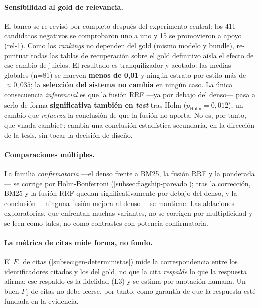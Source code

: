 \paragraph{Sensibilidad al gold de relevancia.} El banco se re-revisó por completo después del experimento central: los 411 candidatos negativos se comprobaron uno a uno y 15 se promovieron a apoyo (rel-1). Como los \emph{rankings} no dependen del gold (mismo modelo y bundle), re-puntuar todas las tablas de recuperación sobre el gold definitivo aísla el efecto de ese cambio de juicios. El resultado es tranquilizador y acotado: las medias globales (n=81) se mueven \textbf{menos de 0,01} y ningún estrato por estilo más de \textbf{${\approx}0{,}035$}; la \textbf{selección del sistema no cambia} en ningún caso. La única consecuencia \emph{inferencial} es que la fusión RRF —ya por debajo del denso— pasa a serlo de forma \textbf{significativa también en \emph{test}} tras Holm ($p_{\text{Holm}}=0{,}012$), un cambio que \emph{refuerza} la conclusión de que la fusión no aporta. No es, por tanto, que «nada cambie»: cambia una conclusión estadística secundaria, en la dirección de la tesis, sin tocar la decisión de diseño.

\paragraph{Comparaciones múltiples.} La familia \emph{confirmatoria} —el denso frente a BM25, la fusión RRF y la ponderada— se corrige por Holm-Bonferroni (\ref{subsec:flagship-pareado}); tras la corrección, BM25 y la fusión RRF quedan significativamente por debajo del denso, y la conclusión —ninguna fusión mejora al denso— se mantiene. Las ablaciones exploratorias, que enfrentan muchas variantes, no se corrigen por multiplicidad y se leen como tales, no como contrastes con potencia confirmatoria.

\paragraph{La métrica de citas mide forma, no fondo.} El $F_1$ de citas (\ref{subsec:gen-deterministas}) mide la correspondencia entre los identificadores citados y los del gold, no que la cita \emph{respalde} lo que la respuesta afirma; ese respaldo es la fidelidad (L3) y se estima por anotación humana. Un buen $F_1$ de citas no debe leerse, por tanto, como garantía de que la respuesta esté fundada en la evidencia.

